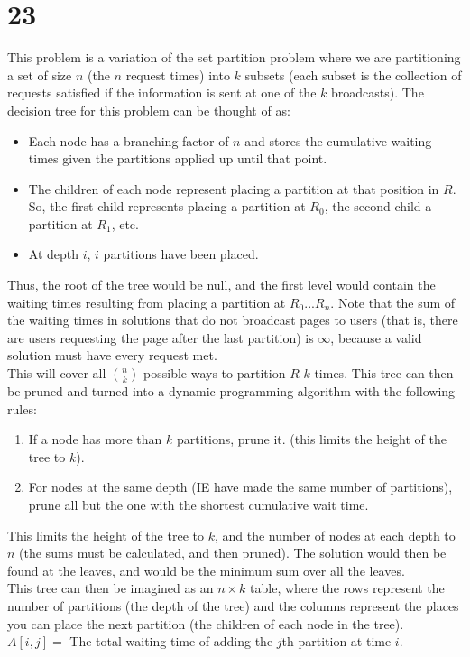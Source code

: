 \documentclass[letterpaper,notitlepage,twoside]{article}
\begin{document}
\section*{23}
This problem is a variation of the set partition problem where we are partitioning a set of size $n$ (the $n$ request times) into $k$ subsets (each subset is the collection of requests satisfied if the information is sent at one of the $k$ broadcasts). The decision tree for this problem can be thought of as:
\begin{itemize}
\item Each node has a branching factor of $n$ and stores the cumulative waiting times given the partitions applied up until that point.
\item The children of each node represent placing a partition at that position in $R$. So, the first child represents placing a partition at $R_0$, the second child a partition at $R_1$, etc. 
\item At depth $i$, $i$ partitions have been placed. 
\end{itemize}
Thus, the root of the tree would be null, and the first level would contain the waiting times resulting from placing a partition at $R_0...R_n$. Note that the sum of the waiting times in solutions that do not broadcast pages to users (that is, there are users requesting the page after the last partition) is $\infty$, because a valid solution must have every request met.\\
This will cover all $\binom{n}{k}$ possible ways to partition $R$ $k$ times. This tree can then be pruned and turned into a dynamic programming algorithm with the following rules:
\begin{enumerate}
\item If a node has more than $k$ partitions, prune it. (this limits the height of the tree to $k$).
\item For nodes at the same depth (IE have made the same number of partitions), prune all but the one with the shortest cumulative wait time. 
\end{enumerate}
This limits the height of the tree to $k$, and the number of nodes at each depth to $n$ (the sums must be calculated, and then pruned). The solution would then be found at the leaves, and would be the minimum sum over all the leaves. \\
This tree can then be imagined as an $n\times k$ table, where the rows represent the number of partitions (the depth of the tree) and the columns represent the places you can place the next partition (the children of each node in the tree). $A[i, j] =$ The total waiting time of adding the $j$th partition at time $i$. \\
\end{document}
